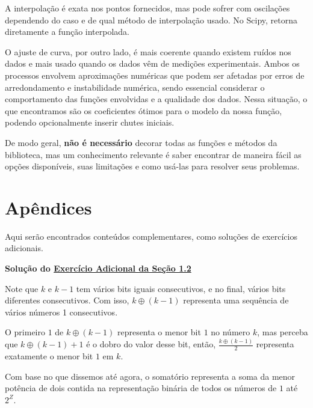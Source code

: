 \documentclass[11pt, a4paper]{article}
\begin{document}
A interpolação é exata nos pontos fornecidos, mas pode sofrer com oscilações dependendo do caso e de qual método de interpolação usado. No Scipy, retorna diretamente a função interpolada.

O ajuste de curva, por outro lado, é mais coerente quando existem ruídos nos dados e mais usado quando os dados vêm de medições experimentais. Ambos os processos envolvem aproximações numéricas que podem ser afetadas por erros de arredondamento e instabilidade numérica, sendo essencial considerar o comportamento das funções envolvidas e a qualidade dos dados. Nessa situação, o que encontramos são os coeficientes ótimos para o modelo da nossa função, podendo opcionalmente inserir chutes iniciais.

De modo geral, \textbf{não é necessário} decorar todas as funções e métodos da biblioteca, mas um conhecimento relevante é saber encontrar de maneira fácil as opções disponíveis, suas limitações e como usá-las para resolver seus problemas.

\newpage

\section{Apêndices}

Aqui serão encontrados conteúdos complementares, como soluções de exercícios adicionais.

\void[1]

\label{sol_c1.2.5}
\textbf{Solução do \hyperref[c1.2.5]{Exercício Adicional da Seção 1.2}}

Note que \(k\) e \(k-1\) tem vários bits iguais consecutivos, e no final, vários bits diferentes consecutivos. Com isso, \(k \oplus(k-1)\) representa uma sequência de vários números 1 consecutivos. 

O primeiro \(1\) de \(k \oplus (k-1)\) representa o menor bit \(1\) no número \(k\), mas perceba que \(k \oplus (k-1)+1\) é o dobro do valor desse bit, então, \(\frac{k \oplus (k-1)}{2}\) representa exatamente o menor bit \(1\) em \(k\).

Com base no que dissemos até agora, o somatório representa a soma da menor potência de dois contida na representação binária de todos os números de \(1\) até \(2^Z\).
\end{document}
